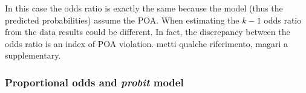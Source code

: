 \documentclass[
  man,floatsintext]{apa6}
\newenvironment{Shaded}{\begin{snugshade}}{\end{snugshade}}
\newcommand{\AttributeTok}[1]{\textcolor[rgb]{0.13,0.29,0.53}{#1}}
\newcommand{\CommentTok}[1]{\textcolor[rgb]{0.56,0.35,0.01}{\textit{#1}}}
\newcommand{\DecValTok}[1]{\textcolor[rgb]{0.00,0.00,0.81}{#1}}
\newcommand{\FunctionTok}[1]{\textcolor[rgb]{0.13,0.29,0.53}{\textbf{#1}}}
\newcommand{\NormalTok}[1]{#1}
\newcommand{\OtherTok}[1]{\textcolor[rgb]{0.56,0.35,0.01}{#1}}
\newcommand{\SpecialCharTok}[1]{\textcolor[rgb]{0.81,0.36,0.00}{\textbf{#1}}}
\newcommand{\StringTok}[1]{\textcolor[rgb]{0.31,0.60,0.02}{#1}}
\begin{document}
\scriptsize

\begin{Shaded}
\end{Shaded}

\normalsize

In this case the odds ratio is exactly the same because the model (thus the predicted probabilities) assume the POA. When estimating the \(k - 1\) odds ratio from the data results could be different. In fact, the discrepancy between the odds ratio is an index of POA violation. metti qualche riferimento, magari a supplementary.

\subsubsection{\texorpdfstring{Proportional odds and \emph{probit} model}{Proportional odds and probit model}}\label{proportional-odds-and-probit-model}
\end{document}
